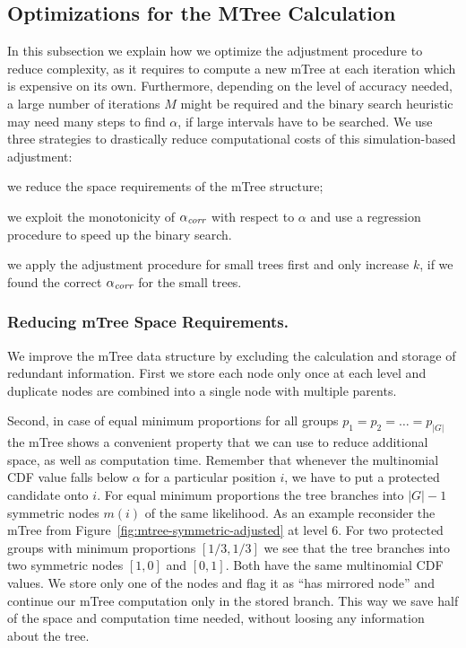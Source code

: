 \subsection{Optimizations for the MTree Calculation}
\label{subsec:mtree-optimization}
In this subsection we explain how we optimize the adjustment procedure to reduce complexity, as it requires to compute a new mTree at each iteration which is expensive on its own.
%
Furthermore, depending on the level of accuracy needed, a large number of iterations $M$ might be required and the binary search heuristic may need many steps to find $\alpha$, if large intervals have to be searched.
%
We use three strategies to drastically reduce computational costs of this simulation-based adjustment:
%
\begin{inparaenum}[(i)]
%
\item we reduce the space requirements of the mTree structure;
%
\item we exploit the monotonicity of $\alpha_\textit{corr}$ with respect to $\alpha$ and use a regression procedure to speed up the binary search.
%
\item we apply the adjustment procedure for small trees first and only increase $k$, if we found the correct  $\alpha_\textit{corr}$ for the small trees.
\end{inparaenum}

\subsubsection{Reducing mTree Space Requirements.}
\label{subsubsec:reducing-space-requirements}
We improve the mTree data structure by excluding the calculation and storage of redundant information.
%
First we store each node only once at each level and duplicate nodes are combined into a single node with multiple parents.

Second, in case of equal minimum proportions for all groups $p_1 = p_2 = \ldots = p_{|G|}$ the mTree shows a convenient property that we can use to reduce additional space, as well as computation time.
%
Remember that whenever the multinomial CDF value falls below $\alpha$ for a particular position $i$, we have to put a protected candidate onto $i$.
%
For equal minimum proportions the tree branches into $|G| - 1$ symmetric nodes $m(i)$ of the same likelihood.
%
As an example reconsider the mTree from Figure~\ref{fig:mtree-symmetric-adjusted} at level 6.
%
For two protected groups with minimum proportions $[1/3, 1/3]$ we see that the tree branches into two symmetric nodes $[1, 0]$ and $[0,1]$.
%
Both have the same multinomial CDF values.
%
We store only one of the nodes and flag it as ``has mirrored node'' and continue our mTree computation only in the stored branch.
%
This way we save half of the space and computation time needed, without loosing any information about the tree.

